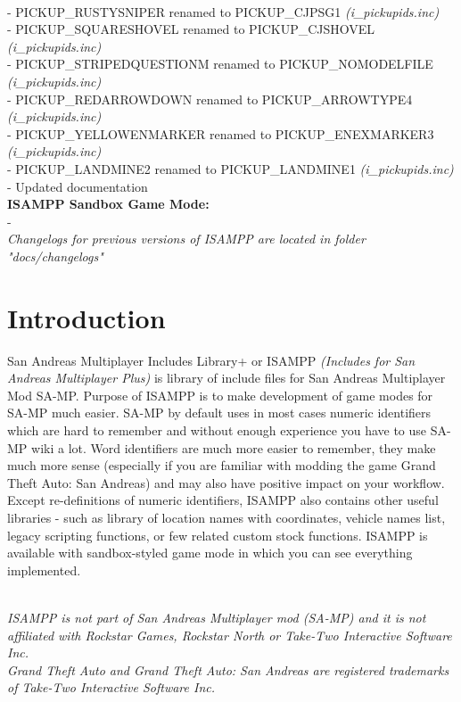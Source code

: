 \documentclass{article}
\begin{document}
\\- PICKUP\_RUSTYSNIPER renamed to PICKUP\_CJPSG1 \textit{(i\_pickupids.inc)}
\\- PICKUP\_SQUARESHOVEL renamed to PICKUP\_CJSHOVEL \textit{(i\_pickupids.inc)}
\\- PICKUP\_STRIPEDQUESTIONM renamed to PICKUP\_NOMODELFILE \textit{(i\_pickupids.inc)}
\\- PICKUP\_REDARROWDOWN renamed to PICKUP\_ARROWTYPE4 \textit{(i\_pickupids.inc)}
\\- PICKUP\_YELLOWENMARKER renamed to PICKUP\_ENEXMARKER3 \textit{(i\_pickupids.inc)}
\\- PICKUP\_LANDMINE2 renamed to PICKUP\_LANDMINE1 \textit{(i\_pickupids.inc)}
\\- Updated documentation
\bigskip
\\\textbf{ISAMPP Sandbox Game Mode:}
\\- 
\bigskip
\\\textit{Changelogs for previous versions of ISAMPP are located in folder "docs/changelogs"}

\newpage
\section{Introduction}
San Andreas Multiplayer Includes Library+ or ISAMPP \textit{(Includes for San Andreas Multiplayer Plus)} is library of include files for San Andreas Multiplayer Mod SA-MP. Purpose of ISAMPP is to make development of game modes for SA-MP much easier. SA-MP by default uses in most cases numeric identifiers which are hard to remember and without enough experience you have to use SA-MP wiki a lot. Word identifiers are much more easier to remember, they make much more sense (especially if you are familiar with modding the game Grand Theft Auto: San Andreas) and may also have positive impact on your workflow. Except re-definitions of numeric identifiers, ISAMPP also contains other useful libraries - such as library of location names with coordinates, vehicle names list, legacy scripting functions, or few related custom stock functions. ISAMPP is available with sandbox-styled game mode in which you can see everything implemented.

\textit{\\ISAMPP is not part of San Andreas Multiplayer mod (SA-MP) and it is not affiliated with Rockstar Games, Rockstar North or Take-Two Interactive Software Inc.}
\textit{\\Grand Theft Auto and Grand Theft Auto: San Andreas are registered trademarks of Take-Two Interactive Software Inc.}
\end{document}
